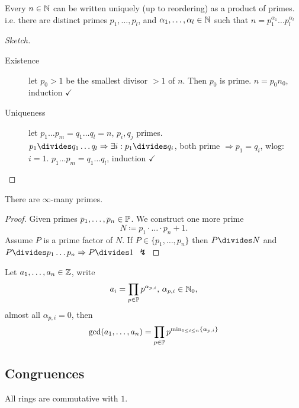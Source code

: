 \documentclass[NumTh.tex]{subfiles}
\begin{document}
\begin{theorem}
Every $n \in \mathbb{N}$ can be written uniquely (up to reordering) as a product of primes.
i.e. there are distinct primes $p_1,\dots,p_l$, and $\alpha_1,\dots,\alpha_l \in \mathbb{N}$ such that
$n = p_1^{\alpha_1} \dots p_l^{\alpha_l}$
\end{theorem}

\begin{proof}[Sketch]\hfill{}
  \begin{description}
    \item[Existence]
      let $p_0 > 1$ be the smallest divisor $> 1$ of $n$. Then $p_0$ is prime.
      $n = p_0 n_0$, induction $\checkmark$

    \item[Uniqueness]
      let $p_1 \dots p_m = q_1 \dots q_l = n$, $p_i, q_j$ primes.
      $p_1 \divides  q_1 \dots q_l \Rightarrow \exists i: p_1\divides q_i$, both prime $\Rightarrow p_1 = q_i$, wlog: $i = 1$.
      $p_1\dots p_m = q_1 \dots q_l$, induction $\checkmark$
  \end{description}
\end{proof}

\begin{theorem}[Euclid]
There are $\infty$-many primes.
\end{theorem}

\begin{proof}
  Given primes $p_1,\dots,p_n \in \mathbb{P}$. We construct one more prime \[N \coloneq p_1 \cdot \dots \cdot p_n + 1 \text{.}\]
  Assume $P$ is a prime factor of $N$.
  If $P \in \{p_1, \dots ,p_n\}$ then $P\divides N$ and $P\divides p_1\dots p_n \Rightarrow P\divides 1$ $\lightning$
\end{proof}

\begin{rem}
Let $a_1,\dots, a_n \in \mathbb{Z}$, write
\[a_i = \prod_{p \in \mathbb{P}} p^{\alpha_{p,i}}\text{, }\alpha_{p,i} \in \mathbb{N}_0 \text{,}\] almost all $\alpha_{p,i} = 0$,
then \[\gcd(a_1,\dots,a_n) = \prod_{p \in \mathbb{P}} p^{\min_{1\leq i\leq n} \{\alpha_{p,i}\}}\]
\end{rem}

\subsection{Congruences}

All rings are commutative with $1$.
\end{document}
